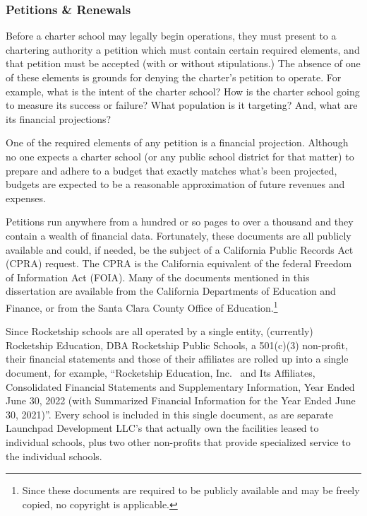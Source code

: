 \subsubsection{Petitions \& Renewals}\label{sec:cs-petitions-renewals}\indent%

Before a charter school may legally begin operations, they must present to a chartering authority a petition which must contain certain required elements, and that petition must be accepted (with or without stipulations.) The absence of one of these elements is grounds for denying the charter's petition to operate. For example, what is the intent of the charter school? How is the charter school going to measure its success or failure? What population is it targeting? And, what are its financial projections? 

One of the required elements of any petition is a financial projection. Although no one expects a charter school (or any public school district for that matter) to prepare and adhere to a budget that exactly matches what's been projected, budgets are expected to be a reasonable approximation of future revenues and expenses.

Petitions run anywhere from a hundred or so pages to over a thousand and they contain a wealth of financial data. Fortunately, these documents are all publicly available and could, if needed, be the subject of a California Public Records Act (CPRA) request. The CPRA is the California equivalent of the federal Freedom of Information Act (FOIA). Many of the documents mentioned in this dissertation are available from the California Departments of Education and Finance, or from the Santa Clara County Office of Education.\footnote{Since these documents are required to be publicly available and may be freely copied, no copyright is applicable.}

Since Rocketship schools are all operated by a single entity, (currently) Rocketship Education, DBA Rocketship Public Schools, a 501(c)(3) non-profit, their financial statements and those of their affiliates are rolled up into a single document, for example, ``Rocketship Education, Inc.  and Its Affiliates, Consolidated Financial Statements and Supplementary Information, Year Ended June 30, 2022
(with Summarized Financial Information for the Year Ended June 30, 2021)''.  Every school is included in this single document, as are separate Launchpad Development LLC's that actually own the facilities leased to individual schools, plus two other non-profits that provide specialized service to the individual schools. %

